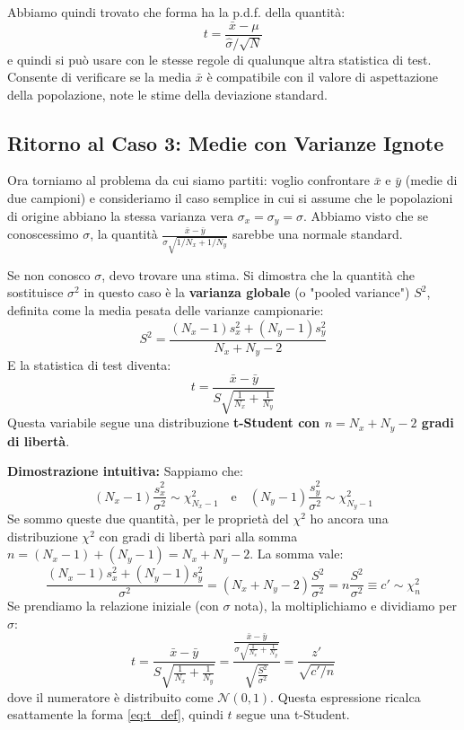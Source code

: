 \documentclass[openany,a4paper,12pt]{book}
\theoremstyle{remark}
\begin{document}
Abbiamo quindi trovato che forma ha la p.d.f. della quantità:
$$ t = \frac{\bar{x}-\mu}{\hat{\sigma}/\sqrt{N}} $$
e quindi si può usare con le stesse regole di qualunque altra statistica di test. Consente di verificare se la media $\bar{x}$ è compatibile con il valore di aspettazione della popolazione, note le stime della deviazione standard.

\subsection*{Ritorno al Caso 3: Medie con Varianze Ignote}
Ora torniamo al problema da cui siamo partiti: voglio confrontare $\bar{x}$ e $\bar{y}$ (medie di due campioni) e consideriamo il caso semplice in cui si assume che le popolazioni di origine abbiano la stessa varianza vera $\sigma_x = \sigma_y = \sigma$.
Abbiamo visto che se conoscessimo $\sigma$, la quantità $\frac{\bar{x}-\bar{y}}{\sigma \sqrt{1/N_x + 1/N_y}}$ sarebbe una normale standard.

Se non conosco $\sigma$, devo trovare una stima. Si dimostra che la quantità che sostituisce $\sigma^2$ in questo caso è la \textbf{varianza globale} (o "pooled variance") $S^2$, definita come la media pesata delle varianze campionarie:
\begin{equation}
    S^2 = \frac{(N_x-1)s_x^2 + (N_y-1)s_y^2}{N_x + N_y - 2}
\end{equation}
E la statistica di test diventa:
\begin{equation}
    t = \frac{\bar{x}-\bar{y}}{S \sqrt{\frac{1}{N_x} + \frac{1}{N_y}}}
\end{equation}
Questa variabile segue una distribuzione \textbf{t-Student con $n = N_x + N_y - 2$ gradi di libertà}.

\textbf{Dimostrazione intuitiva:}
Sappiamo che:
$$ (N_x-1)\frac{s_x^2}{\sigma^2} \sim \chi^2_{N_x-1} \quad \text{e} \quad (N_y-1)\frac{s_y^2}{\sigma^2} \sim \chi^2_{N_y-1} $$
Se sommo queste due quantità, per le proprietà del $\chi^2$ ho ancora una distribuzione $\chi^2$ con gradi di libertà pari alla somma $n = (N_x-1) + (N_y-1) = N_x + N_y - 2$.
La somma vale:
$$ \frac{(N_x-1)s_x^2 + (N_y-1)s_y^2}{\sigma^2} = (N_x + N_y - 2)\frac{S^2}{\sigma^2} = n \frac{S^2}{\sigma^2} \equiv c' \sim \chi^2_n $$
Se prendiamo la relazione iniziale (con $\sigma$ nota), la moltiplichiamo e dividiamo per $\sigma$:
$$ t = \frac{\bar{x}-\bar{y}}{S \sqrt{\frac{1}{N_x}+\frac{1}{N_y}}} = \frac{\frac{\bar{x}-\bar{y}}{\sigma \sqrt{\frac{1}{N_x}+\frac{1}{N_y}}}}{\sqrt{\frac{S^2}{\sigma^2}}} = \frac{z'}{\sqrt{c'/n}} $$
dove il numeratore è distribuito come $\mathcal{N}(0,1)$. Questa espressione ricalca esattamente la forma \eqref{eq:t_def}, quindi $t$ segue una t-Student.
\end{document}

